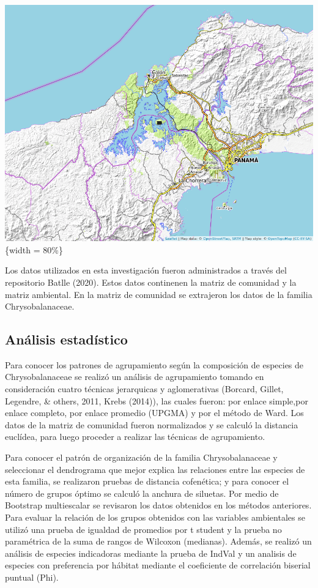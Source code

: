 \documentclass[11pt,]{article}
\begin{document}
\includegraphics{mapa_cuadros_panama.png}\{width = 80\%\}

Los datos utilizados en esta investigación fueron administrados a través
del repositorio Batlle (2020). Estos datos continenen la matriz de
comunidad y la matriz ambiental. En la matriz de comunidad se extrajeron
los datos de la familia Chrysobalanaceae.

\subsection{Análisis estadístico}\label{anuxe1lisis-estaduxedstico}

Para conocer los patrones de agrupamiento según la composición de
especies de Chrysobalanaceae se realizó un análisis de agrupamiento
tomando en consideración cuatro técnicas jerarquicas y aglomerativas
(Borcard, Gillet, Legendre, \& others, 2011, Krebs (2014)), las cuales
fueron: por enlace simple,por enlace completo, por enlace promedio
(UPGMA) y por el método de Ward. Los datos de la matriz de comunidad
fueron normalizados y se calculó la distancia euclídea, para luego
proceder a realizar las técnicas de agrupamiento.

Para conocer el patrón de organización de la familia Chrysobalanaceae y
seleccionar el dendrograma que mejor explica las relaciones entre las
especies de esta familia, se realizaron pruebas de distancia cofenética;
y para conocer el número de grupos óptimo se calculó la anchura de
siluetas. Por medio de Bootstrap multiescalar se revisaron los datos
obtenidos en los métodos anteriores. Para evaluar la relación de los
grupos obtenidos con las variables ambientales se utilizó una prueba de
igualdad de promedios por t student y la prueba no paramétrica de la
suma de rangos de Wilcoxon (medianas). Además, se realizó un análisis de
especies indicadoras mediante la prueba de IndVal y un analisis de
especies con preferencia por hábitat mediante el coeficiente de
correlación biserial puntual (Phi).
\end{document}

